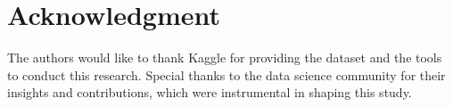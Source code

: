 \documentclass{article} %
\begin{document}
\section*{Acknowledgment}
The authors would like to thank Kaggle for providing the dataset and the tools to conduct this research. Special thanks to the data science community for their insights and contributions, which were instrumental in shaping this study.


\end{document}
